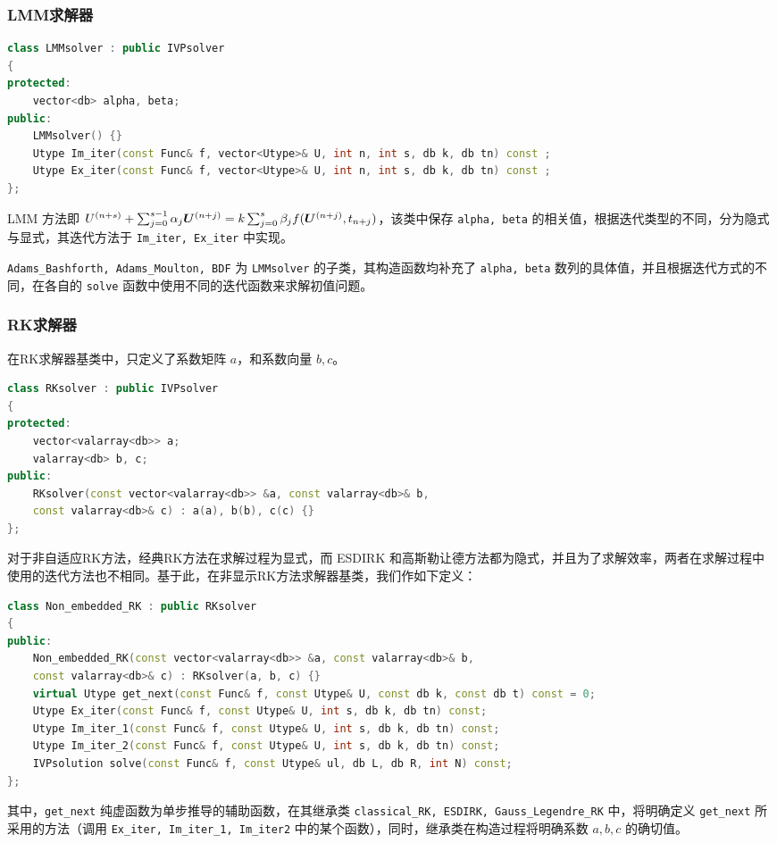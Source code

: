 \documentclass[lang=cn,a4paper,newtx,bibend=bibtex]{elegantpaper}
\begin{document}
\subsubsection{LMM求解器}

\begin{lstlisting}[language=C++]
class LMMsolver : public IVPsolver
{
protected:
    vector<db> alpha, beta;
public:
    LMMsolver() {}
    Utype Im_iter(const Func& f, vector<Utype>& U, int n, int s, db k, db tn) const ;
    Utype Ex_iter(const Func& f, vector<Utype>& U, int n, int s, db k, db tn) const ;
};
\end{lstlisting}

LMM 方法即 $U^{(n+s)} + \sum_{j=0}^{s-1} \alpha_j \bm{U}^{(n+j)} = k \sum_{j=0}^s \beta_j f(\bm{U}^{(n+j)}, t_{n+j})$，该类中保存 \texttt{alpha, beta} 的相关值，根据迭代类型的不同，分为隐式与显式，其迭代方法于 \lstinline{Im_iter, Ex_iter} 中实现。

\lstinline{Adams_Bashforth, Adams_Moulton, BDF} 为 \lstinline{LMMsolver} 的子类，其构造函数均补充了 \texttt{alpha, beta} 数列的具体值，并且根据迭代方式的不同，在各自的 \texttt{solve} 函数中使用不同的迭代函数来求解初值问题。

\subsubsection{RK求解器}
在RK求解器基类中，只定义了系数矩阵 $a$，和系数向量 $b, c$。
\begin{lstlisting}[language=C++]
class RKsolver : public IVPsolver
{
protected:
    vector<valarray<db>> a;
    valarray<db> b, c;
public:
    RKsolver(const vector<valarray<db>> &a, const valarray<db>& b, 
    const valarray<db>& c) : a(a), b(b), c(c) {}
};
\end{lstlisting}

对于非自适应RK方法，经典RK方法在求解过程为显式，而 ESDIRK 和高斯勒让德方法都为隐式，并且为了求解效率，两者在求解过程中使用的迭代方法也不相同。基于此，在非显示RK方法求解器基类，我们作如下定义：
\begin{lstlisting}[language=C++]
class Non_embedded_RK : public RKsolver
{
public:
    Non_embedded_RK(const vector<valarray<db>> &a, const valarray<db>& b, 
    const valarray<db>& c) : RKsolver(a, b, c) {}
    virtual Utype get_next(const Func& f, const Utype& U, const db k, const db t) const = 0;
    Utype Ex_iter(const Func& f, const Utype& U, int s, db k, db tn) const;
    Utype Im_iter_1(const Func& f, const Utype& U, int s, db k, db tn) const;
    Utype Im_iter_2(const Func& f, const Utype& U, int s, db k, db tn) const;
    IVPsolution solve(const Func& f, const Utype& ul, db L, db R, int N) const;
};
\end{lstlisting}
其中，\lstinline{get_next} 纯虚函数为单步推导的辅助函数，在其继承类 \lstinline{classical_RK, ESDIRK, Gauss_Legendre_RK} 中，将明确定义 \lstinline{get_next} 所采用的方法（调用 \lstinline{Ex_iter, Im_iter_1, Im_iter2} 中的某个函数），同时，继承类在构造过程将明确系数 $a, b, c$ 的确切值。
\end{document}
